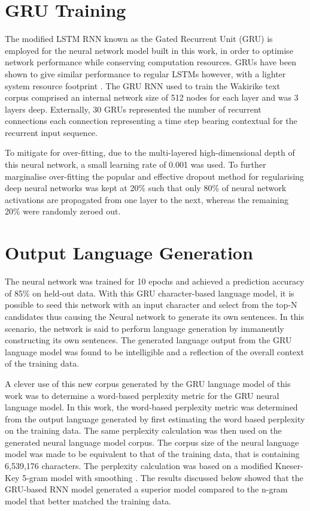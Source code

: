 \section{GRU Training}

The modified LSTM RNN known as the Gated Recurrent Unit (GRU) is employed for the neural network model built in this work, in order to optimise network performance while conserving computation resources.  GRUs have been shown to give similar performance to regular LSTMs however, with a lighter system resource footprint \citep{cho2014learning}. The GRU RNN used to train the Wakirike text corpus comprised an internal network size of 512 nodes for each layer and was 3 layers deep. Externally, 30 GRUs represented  the number of recurrent connections each connection representing a time step bearing contextual for the recurrent input sequence. 

To mitigate for over-fitting, due to the multi-layered high-dimensional depth of this neural network, a small learning rate of 0.001 was used. To further marginalise over-fitting the popular and effective dropout method \citep{srivastava2014dropout} for regularising deep neural networks was kept at 20\% such that only 80\% of neural network activations are propagated from one layer to the next, whereas the remaining 20\% were randomly zeroed out.

\section{Output Language Generation}
The neural network was trained for 10 epochs and achieved a prediction accuracy of 85\% on held-out data.  With this GRU character-based language model, it is possible to seed this network with an input character and select from the top-N candidates thus causing the Neural network to generate its own sentences.  In this scenario, the network is said to perform language generation by immanently constructing its own sentences.  The generated language output from the GRU language model was found to be intelligible and a reflection of the overall context of the training data.

A clever use of this new corpus generated by the GRU language model of this work was to determine a word-based perplexity metric for the GRU neural language model. In this work, the word-based perplexity metric was determined from the output language generated by first estimating the word based perplexity on the training data.  The same perplexity calculation was then used on the generated neural language model corpus. The corpus size of the neural language model was made to be equivalent to that of the training data, that is containing 6,539,176 characters.  The perplexity calculation was based on a modified Kneser-Key 5-gram model with smoothing \citep{Heafield-estimate}.  The results discussed below showed that the GRU-based RNN model generated a superior model compared to the n-gram model that better matched the training data.

